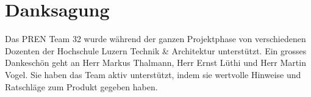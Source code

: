 \section{Danksagung}
Das PREN Team 32 wurde während der ganzen Projektphase von verschiedenen Dozenten der Hochschule Luzern Technik \& Architektur unterstützt. 
Ein grosses Dankeschön geht an Herr Markus Thalmann, Herr Ernst Lüthi und Herr Martin Vogel. Sie haben das Team aktiv unterstützt, 
indem sie wertvolle Hinweise und Ratschläge zum Produkt gegeben haben.
